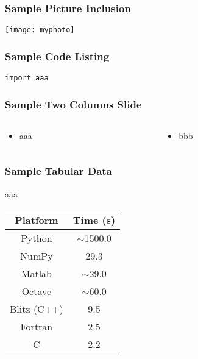 \begin{frame}[fragile]\frametitle{Sample Picture Inclusion}

\begin{center}
\texttt{[image: myphoto]}
\end{center}	  
\end{frame}

\begin{frame}[fragile] \frametitle{Sample Code Listing}
\begin{lstlisting}
import aaa
\end{lstlisting}

\end{frame}

\begin{frame}[fragile]\frametitle{Sample Two Columns Slide}
\begin{columns}
    \begin{column}[T]{0.6\linewidth}
      \begin{itemize}
		\item aaa
	  \end{itemize}

    \end{column}
    \begin{column}[T]{0.4\linewidth}
      \begin{itemize}
		\item bbb
	  \end{itemize}
    \end{column}
  \end{columns}
\end{frame}

\begin{frame}[fragile]\frametitle{Sample Tabular Data}

aaa

\begin{tabular}{|c|c|}
	\hline
	Platform & Time (s) \\
	\hline \hline
	Python & $\sim$1500.0 \\
	\hline
	NumPy & 29.3 \\
	\hline
	Matlab & $\sim$29.0 \\
	\hline
	Octave & $\sim$60.0 \\
	\hline
	Blitz (C++) & 9.5 \\
	\hline
	Fortran & 2.5 \\
	\hline
	C & 2.2 \\
	\hline
\end{tabular}

\end{frame}
